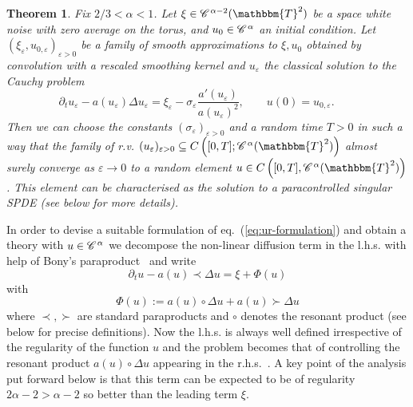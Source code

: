 \documentclass[11pt,reqno]{amsart}
\newcommand{\assign}{:=}
\newtheorem{theorem}{Theorem}
\newcommand{\CC}{\mathscr{C} \hspace{.1em}}
\begin{document}
\begin{theorem}
  Fix $2 / 3 < \alpha < 1$. Let $\xi \in \CC^{\alpha - 2} (\mathbbm{T}^2)$ be
  a space white noise with zero average on the torus, and $u_0 \in
  \CC^{\alpha}$ an initial condition. Let $(\xi_{\varepsilon}, u_{0,
  \varepsilon})_{\varepsilon > 0}$ be a family of smooth approximations to
  $\xi, u_0$ obtained by convolution with a rescaled smoothing kernel and
  $u_{\varepsilon}$ the classical solution to the Cauchy problem
  \begin{equation}
    \partial_t u_{\varepsilon} - a (u_{\varepsilon}) \Delta u_{\varepsilon} =
    \xi_{\varepsilon} - \sigma_{\varepsilon} \frac{a' (u_{\varepsilon})}{a
    (u_{\varepsilon})^2}, \qquad u (0) = u_{0, \varepsilon} . \qquad
    \label{eq:ur-formulation-approx}
  \end{equation}
  Then we can choose the constants $(\sigma_{\varepsilon})_{\varepsilon > 0}$
  and a random time $T > 0$ in such a way that the family of r.v.
  $(u_{\varepsilon})_{\varepsilon > 0} \subseteq C \left( [0, T] ;
  \CC^{\alpha} (\mathbbm{T}^2) \right)$ almost surely converge as $\varepsilon
  \rightarrow 0$ to a random element $u \in C \left( [0, T], \CC^{\alpha}
  (\mathbbm{T}^2) \right)$. This element can be characterised as the solution
  to a paracontrolled singular SPDE (see below for more details).
\end{theorem}

In order to devise a suitable formulation of eq.~(\ref{eq:ur-formulation}) and
obtain a theory with $u \in \CC^{\alpha}$ we decompose the non-linear
diffusion term in the l.h.s. with help of Bony's
paraproduct~{\cite{meyer_remarques_1981}} and write
\begin{equation}
  \partial_t u - a (u) \prec \Delta u = \xi + \Phi (u)
  \label{e:paracontrolled-eq}
\end{equation}
with
\begin{equation}
  \Phi (u) \assign a (u) \circ \Delta u + a (u) \succ \Delta u
  \label{e:def-Phi}
\end{equation}
where $\prec, \succ$ are standard paraproducts and $\circ$ denotes the
resonant product (see below for precise definitions). Now the l.h.s. is always
well defined irrespective of the regularity of the function $u$ and the
problem becomes that of controlling the resonant product $a (u) \circ \Delta
u$ appearing in the r.h.s.~. A key point of the analysis put forward below is
that this term can be expected to be of regularity $2 \alpha - 2 > \alpha - 2$
so better than the leading term $\xi$.
\end{document}
